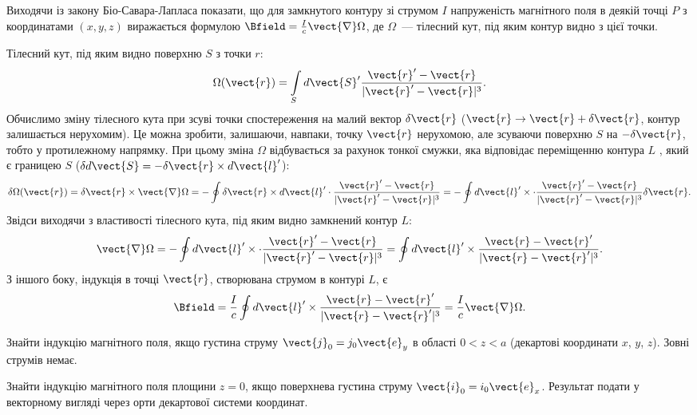 \begin{problem}
Виходячи із закону Біо-Савара-Лапласа показати, що для замкнутого контуру зі струмом $I$ напруженість магнітного поля в деякій точці $P$ з координатами $(x,y,z)$ виражається формулою $\Bfield = \frac{I}{c} \vect{\nabla}\Omega$, де $\Omega$~--- тілесний кут, під яким контур видно з цієї точки.
\begin{solution}
    Тілесний кут, під яким видно поверхню $S$ з точки $r$: 
    \[
        \Omega(\vect{r}) = \int\limits_S d\vect{S}'\frac{\vect{r}' - \vect{r}}{|\vect{r}' - \vect{r}|^3}.
    \]
    Обчислимо зміну тілесного кута при зсуві точки спостереження на малий вектор $\delta\vect{r}$   ($\vect{r} \to \vect{r} + \delta\vect{r}$, контур залишається нерухомим). Це можна зробити, залишаючи, навпаки, точку $\vect{r}$  нерухомою, але зсуваючи поверхню $S$  на $-\delta\vect{r}$, тобто у протилежному напрямку. При цьому зміна $\Omega$ відбувається за рахунок тонкої смужки, яка відповідає переміщенню контура $L$ , який є границею $S$ ($\delta d{\vect{S}} =  - \delta\vect{r} \times d{\vect{l}'}$):
    \[
        \delta\Omega(\vect{r}) = \delta\vect{r}\times \vect{\nabla}\Omega = -\oint \delta\vect{r}\times d\vect{l}' \cdot \frac{\vect{r}' - \vect{r}}{|\vect{r}' - \vect{r}|^3} = - \oint  d\vect{l}' \times \cdot \frac{\vect{r}' - \vect{r}}{|\vect{r}' - \vect{r}|^3} \delta\vect{r}.
    \]
    Звідси виходячи з властивості тілесного кута, під яким видно замкнений контур $L$:
	\[
		\vect{\nabla}\Omega = - \oint  d\vect{l}' \times \cdot \frac{\vect{r}' - \vect{r}}{|\vect{r}' - \vect{r}|^3} = \oint  d\vect{l}' \times  \frac{\vect{r} - \vect{r}'}{|\vect{r} - \vect{r}'|^3}.
	\]
    З іншого боку, індукція в точці $\vect{r}$, створювана струмом в контурі $L$, є
	\[
		\Bfield = \frac{I}{c} \oint  d\vect{l}' \times  \frac{\vect{r} - \vect{r}'}{|\vect{r} - \vect{r}'|^3} = \frac{I}{c} \vect{\nabla}\Omega.
	\]
\end{solution}
\end{problem}


\begin{problem}
Знайти індукцію магнітного поля, якщо густина струму $\vect{j}_0 = j_0\vect{e}_y$   в області  $0 < z < a$ (декартові координати $x$, $y$, $z$). Зовні струмів немає.
\end{problem}

\begin{problem}
Знайти індукцію магнітного поля площини $z=0$, якщо поверхнева густина струму $\vect{i}_0 = i_0\vect{e}_x$. Результат подати у векторному вигляді через орти декартової системи координат.
\end{problem}

